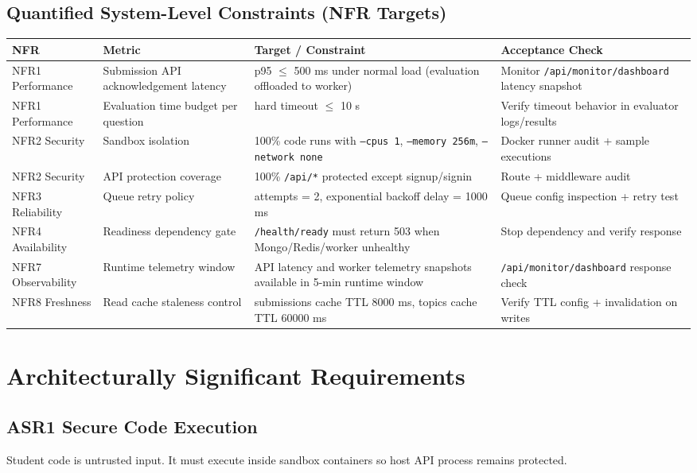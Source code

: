 \documentclass[12pt,journal,onecolumn]{IEEEtran}
\begin{document}
\subsection{Quantified System-Level Constraints (NFR Targets)}
\begin{longtable}{|p{2.2cm}|p{3.4cm}|p{4.6cm}|p{4.6cm}|}
\hline
\textbf{NFR} & \textbf{Metric} & \textbf{Target / Constraint} & \textbf{Acceptance Check} \\
\hline
NFR1 Performance & Submission API acknowledgement latency & p95 $\leq$ 500 ms under normal load (evaluation offloaded to worker) & Monitor \texttt{/api/monitor/dashboard} latency snapshot \\
\hline
NFR1 Performance & Evaluation time budget per question & hard timeout $\leq$ 10 s & Verify timeout behavior in evaluator logs/results \\
\hline
NFR2 Security & Sandbox isolation & 100\% code runs with \texttt{--cpus 1}, \texttt{--memory 256m}, \texttt{--network none} & Docker runner audit + sample executions \\
\hline
NFR2 Security & API protection coverage & 100\% \texttt{/api/*} protected except signup/signin & Route + middleware audit \\
\hline
NFR3 Reliability & Queue retry policy & attempts = 2, exponential backoff delay = 1000 ms & Queue config inspection + retry test \\
\hline
NFR4 Availability & Readiness dependency gate & \texttt{/health/ready} must return 503 when Mongo/Redis/worker unhealthy & Stop dependency and verify response \\
\hline
NFR7 Observability & Runtime telemetry window & API latency and worker telemetry snapshots available in 5-min runtime window & \texttt{/api/monitor/dashboard} response check \\
\hline
NFR8 Freshness & Read cache staleness control & submissions cache TTL 8000 ms, topics cache TTL 60000 ms & Verify TTL config + invalidation on writes \\
\hline
\end{longtable}

\section{Architecturally Significant Requirements}

\subsection{ASR1 Secure Code Execution}
Student code is untrusted input. It must execute inside sandbox containers so host API process remains protected.
\end{document}
